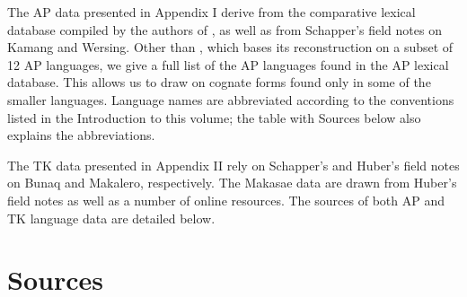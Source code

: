 \documentclass[output=paper]{LSP/langsci}
\begin{document}
The AP data presented in Appendix I derive from the comparative lexical database compiled by the authors of \citet{HoltonEtAl2012}, as well as from Schapper's field notes on Kamang and Wersing. Other than \citet{HoltonEtAl2012}, which bases its reconstruction on a subset of 12 AP languages, we give a full list of the AP languages found in the AP lexical database. This allows us to draw on cognate forms found only in some of the smaller languages. Language names are abbreviated according to the conventions listed in the Introduction to this volume; the table with Sources below also explains the abbreviations.

The TK data presented in Appendix II rely on Schapper's and Huber's field notes on Bunaq and Makalero, respectively. The Makasae data are drawn from Huber's field notes as well as a number of online resources. The sources of both AP and TK language data are detailed below.

\section{Sources}
\end{document}
